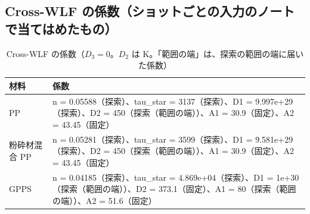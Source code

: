 \documentclass[paper=a4paper,fontsize=10.5pt,line_length=44zw,number_of_lines=38]{jlreq}
\begin{document}
\subsection{Cross-WLF の係数（ショットごとの入力のノートで当てはめたもの）}
\begin{table}[H]
\caption{Cross-WLF の係数（$D_3=0$。$D_2$ は K。「範囲の端」は、探索の範囲の端に届いた係数）}\label{tab:cw}
\scriptsize
\begin{tabularx}{\linewidth}{@{}lX@{}}
\toprule
材料 & 係数 \\
\midrule
PP & n = 0.05588（探索）、tau\_star = 3137（探索）、D1 = 9.997e+29（探索）、D2 = 450（探索（範囲の端））、A1 = 30.9（固定）、A2 = 43.45（固定） \\
粉砕材混合 PP & n = 0.05281（探索）、tau\_star = 3599（探索）、D1 = 9.581e+29（探索）、D2 = 450（探索（範囲の端））、A1 = 30.9（固定）、A2 = 43.45（固定） \\
GPPS & n = 0.04185（探索）、tau\_star = 4.869e+04（探索）、D1 = 1e+30（探索（範囲の端））、D2 = 373.1（固定）、A1 = 80（探索（範囲の端））、A2 = 51.6（固定） \\
\bottomrule
\end{tabularx}
\end{table}
\end{document}
